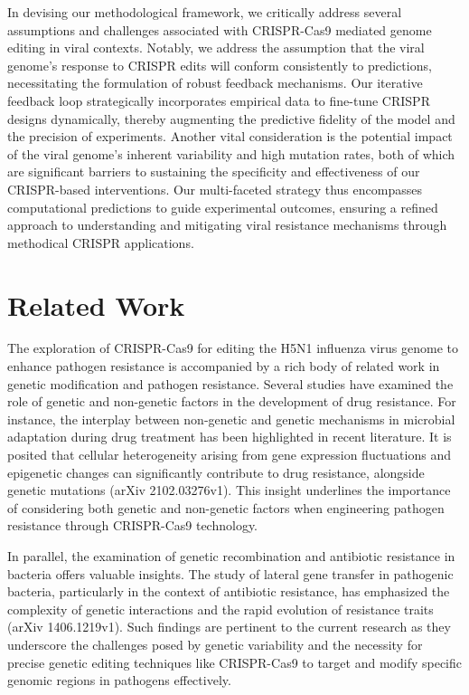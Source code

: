 \documentclass{article}
\begin{document}
In devising our methodological framework, we critically address several assumptions and challenges associated with CRISPR-Cas9 mediated genome editing in viral contexts. Notably, we address the assumption that the viral genome's response to CRISPR edits will conform consistently to predictions, necessitating the formulation of robust feedback mechanisms. Our iterative feedback loop strategically incorporates empirical data to fine-tune CRISPR designs dynamically, thereby augmenting the predictive fidelity of the model and the precision of experiments. Another vital consideration is the potential impact of the viral genome's inherent variability and high mutation rates, both of which are significant barriers to sustaining the specificity and effectiveness of our CRISPR-based interventions. Our multi-faceted strategy thus encompasses computational predictions to guide experimental outcomes, ensuring a refined approach to understanding and mitigating viral resistance mechanisms through methodical CRISPR applications.

\section{Related Work}
The exploration of CRISPR-Cas9 for editing the H5N1 influenza virus genome to enhance pathogen resistance is accompanied by a rich body of related work in genetic modification and pathogen resistance. Several studies have examined the role of genetic and non-genetic factors in the development of drug resistance. For instance, the interplay between non-genetic and genetic mechanisms in microbial adaptation during drug treatment has been highlighted in recent literature. It is posited that cellular heterogeneity arising from gene expression fluctuations and epigenetic changes can significantly contribute to drug resistance, alongside genetic mutations (arXiv 2102.03276v1). This insight underlines the importance of considering both genetic and non-genetic factors when engineering pathogen resistance through CRISPR-Cas9 technology.

In parallel, the examination of genetic recombination and antibiotic resistance in bacteria offers valuable insights. The study of lateral gene transfer in pathogenic bacteria, particularly in the context of antibiotic resistance, has emphasized the complexity of genetic interactions and the rapid evolution of resistance traits (arXiv 1406.1219v1). Such findings are pertinent to the current research as they underscore the challenges posed by genetic variability and the necessity for precise genetic editing techniques like CRISPR-Cas9 to target and modify specific genomic regions in pathogens effectively.
\end{document}
